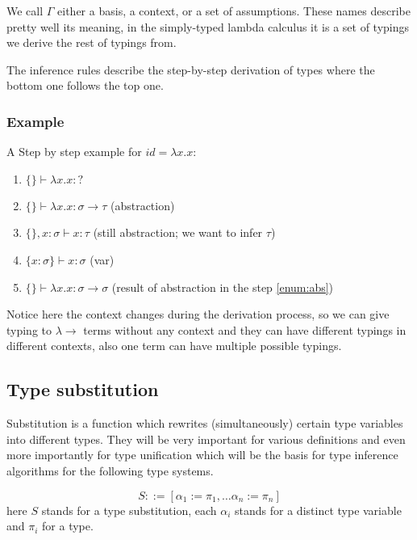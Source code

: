 We call $\Gamma$ either a basis, a context, or a set of assumptions. These names describe pretty well its meaning, in the simply-typed lambda calculus it is a set of typings we derive the rest of typings from.

The inference rules describe the step-by-step derivation of types where the bottom one follows the top one.

\subsubsection{Example}
A Step by step example for $id = \lambda x . x$:

\begin{enumerate}
    \item $\{\} \vdash \lambda x . x : ?$
    \item $\{\} \vdash \lambda x . x : \sigma \rightarrow \tau$ (abstraction) \label{enum:abs}
    \item $\{\}, x : \sigma \vdash x : \tau$ (still abstraction; we want to infer $\tau$)
    \item $\{x : \sigma\} \vdash x : \sigma$ (var)
    \item $\{\} \vdash \lambda x . x : \sigma \rightarrow \sigma$ (result of abstraction in the step \ref{enum:abs})
\end{enumerate}

Notice here the context changes during the derivation process, so we can give typing to $\lambda\rightarrow$ terms without any context and they can have different typings in different contexts, also one term can have multiple possible typings.


\subsection{Type substitution}

Substitution is a function which rewrites (simultaneously) certain type variables into different types. They will be very important for various definitions and even more importantly for type unification which will be the basis for type inference algorithms for the following type systems.

\begin{defn}
    \label{defn:substitution}
    $$S ::= [\alpha_1 := \pi_1, \dots \alpha_n := \pi_n]$$
    here $S$ stands for a type substitution, each $\alpha_i$ stands for a distinct type variable and $\pi_i$ for a type.
\end{defn}

